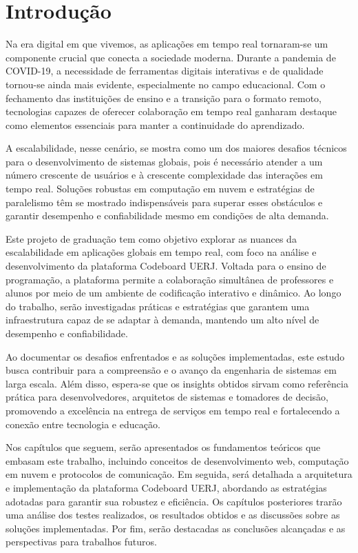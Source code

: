 \chapter*{Introdução}

Na era digital em que vivemos, as aplicações em tempo real tornaram-se um componente crucial que conecta a sociedade moderna. Durante a pandemia de COVID-19, a necessidade de ferramentas digitais interativas e de qualidade tornou-se ainda mais evidente, especialmente no campo educacional\cite{impact-covid19-teaching-learning}. Com o fechamento das instituições de ensino e a transição para o formato remoto, tecnologias capazes de oferecer colaboração em tempo real ganharam destaque como elementos essenciais para manter a continuidade do aprendizado.

A escalabilidade, nesse cenário, se mostra como um dos maiores desafios técnicos para o desenvolvimento de sistemas globais, pois é necessário atender a um número crescente de usuários e à crescente complexidade das interações em tempo real. Soluções robustas em computação em nuvem e estratégias de paralelismo têm se mostrado indispensáveis para superar esses obstáculos e garantir desempenho e confiabilidade mesmo em condições de alta demanda.

Este projeto de graduação tem como objetivo explorar as nuances da escalabilidade em aplicações globais em tempo real, com foco na análise e desenvolvimento da plataforma Codeboard UERJ. Voltada para o ensino de programação, a plataforma permite a colaboração simultânea de professores e alunos por meio de um ambiente de codificação interativo e dinâmico. Ao longo do trabalho, serão investigadas práticas e estratégias que garantem uma infraestrutura capaz de se adaptar à demanda, mantendo um alto nível de desempenho e confiabilidade.

Ao documentar os desafios enfrentados e as soluções implementadas, este estudo busca contribuir para a compreensão e o avanço da engenharia de sistemas em larga escala. Além disso, espera-se que os insights obtidos sirvam como referência prática para desenvolvedores, arquitetos de sistemas e tomadores de decisão, promovendo a excelência na entrega de serviços em tempo real e fortalecendo a conexão entre tecnologia e educação.

Nos capítulos que seguem, serão apresentados os fundamentos teóricos que embasam este trabalho, incluindo conceitos de desenvolvimento web, computação em nuvem e protocolos de comunicação. Em seguida, será detalhada a arquitetura e implementação da plataforma Codeboard UERJ, abordando as estratégias adotadas para garantir sua robustez e eficiência. Os capítulos posteriores trarão uma análise dos testes realizados, os resultados obtidos e as discussões sobre as soluções implementadas. Por fim, serão destacadas as conclusões alcançadas e as perspectivas para trabalhos futuros.